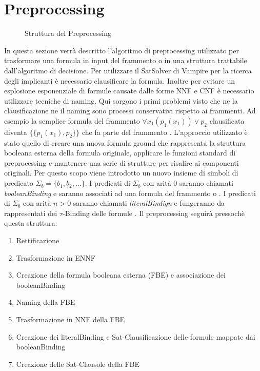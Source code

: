 \documentclass[./main.tex]{subfiles}
\begin{document}
\section{Preprocessing}

\begin{figure}[H]
    \centering
    \scalebox{0.55}{
        
    }
    \caption{Struttura del Preprocessing}
    \label{fig:preprocessing}
\end{figure}

In questa sezione verrà descritto l'algoritmo di preprocessing utilizzato per trasformare una formula in input
del frammento \ob o \cb in una struttura trattabile dall'algoritmo di decisione.
Per utilizzare il SatSolver di Vampire per la ricerca degli implicanti è necessario clausificare la formula.
Inoltre per evitare un esplosione esponenziale di formule causate dalle forme NNF e CNF è necessario utilizzare tecniche di naming.
Qui sorgono i primi problemi visto che ne la clausificazione ne il naming sono processi conservativi rispetto ai frammenti.
Ad esempio la semplice formula del frammento \ob $\forall x_1 (p_1(x_1)) \lor p_2$ clausificata diventa  $\{\{p_1(x_1), p_2\}\}$ che fa parte del frammento \dbb.
L'approccio utilizzato è stato quello di creare una nuova formula ground che rappresenta la struttura booleana esterna della formula originale,
applicare le funzioni standard di preprocessing
e mantenere una serie di strutture per risalire ai componenti originali.
Per questo scopo viene introdotto un nuovo insieme di simboli di predicato $\Sigma_b = \{b_1, b_2, ...\}$.
I predicati di $\Sigma_b$ con arità 0 saranno chiamati \textit{booleanBinding} e saranno associati ad una formula del frammento \ob o \cb.
I predicati di $\Sigma_b$ con arità $n > 0$ saranno chiamati \textit{literalBindign} e fungeranno da rappresentati dei $\tau$-Binding delle formule \ob.
Il preprocessing seguirà pressochè questa struttura:

\begin{enumerate}
    \item Rettificazione
    \item Trasformazione in ENNF
    \item Creazione della formula booleana esterna (FBE) e associazione dei booleanBinding
    \item Naming della FBE
    \item Trasformazione in NNF della FBE
    \item Creazione dei literalBinding e Sat-Clausificazione delle formule mappate dai booleanBinding
    \item Creazione delle Sat-Clausole della FBE
\end{enumerate}
\end{document}

